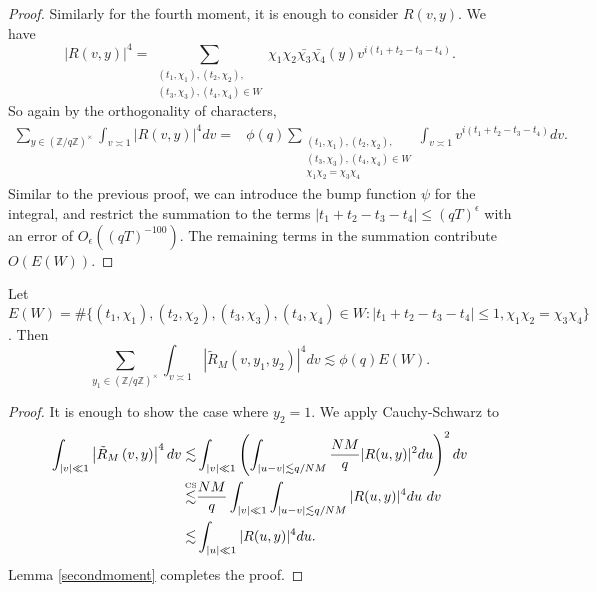 \begin{proof}
	Similarly for the fourth moment, it is enough to consider $R(v,y)$. We have \[
	|R(v,y)|^4 = \sum_{\substack{(t_1,\chi_1),(t_2,\chi_2),\\ (t_3,\chi_3),(t_4,\chi_4)\in  W}}
	\chi_1{\chi}_2\bar{\chi_3}\bar{\chi_4}(y)v^{i(t_1+t_2-t_3-t_4)}.
	\]
	So again by the orthogonality of characters, \begin{align*}
		\sum_{y\in (\mathbb{Z}/q\mathbb{Z})^\times} \int_{v\asymp 1} 
		\left|R\left(v,y\right)\right|^4dv = & \phi(q)
		\sum_{\substack{(t_1,\chi_1),(t_2,\chi_2),\\ (t_3,\chi_3),(t_4,\chi_4)\in  W\\ \chi_1\chi_2=\chi_3\chi_4}} \int_{v\asymp 1} v^{i(t_1+t_2-t_3-t_4)} dv.
	\end{align*}
	Similar to the previous proof, we can introduce the bump function $\psi$ for the integral, and restrict the summation to the terms $|t_1+t_2-t_3-t_4|\leq (qT)^\epsilon$ with an error of $O_\epsilon((qT)^{-100})$. The remaining terms in the summation contribute $O(E( W))$.
\end{proof}
\begin{lemma}\label{fourthmoment_smooth}
	Let $E( W)=\#\{(t_1,\chi_1),(t_2,\chi_2),(t_3,\chi_3),(t_4,\chi_4)\in  W  :  |t_1+t_2-t_3-t_4|\leq 1, \chi_1\chi_2=\chi_3\chi_4\}$. Then \[
	\sum_{y_1\in (\mathbb{Z}/q\mathbb{Z})^\times} \int_{v\asymp 1} 
	\left|\tilde{R}_M\left(v,y_1,y_2\right)\right|^4dv  \lesssim \phi(q)E( W).
	\]
\end{lemma}
\begin{proof}
	It is enough to show the case where $y_2=1$.
	We apply Cauchy-Schwarz to \begin{align*}
		\int_{|v|\ll 1} 
		\left|\tilde{R}_M\left(v,y\right)\right|^4dv  \lesssim& \int_{|v|\ll 1} 
		\left(\int_{|u-v|\lesssim q/NM}
		\frac{NM}{q}|R(u,y)|^2 du\right)^2
		dv \\
		\stackon{CS}{\lesssim}& \frac{NM}{q} \int_{|v|\ll 1} 
		\int_{|u-v|\lesssim q/NM}
		|R(u,y)|^4 du \ 
		dv\\
		\lesssim&  
		\int_{|u|\ll 1}
		|R(u,y)|^4 du.
	\end{align*}
	Lemma \ref{secondmoment} completes the proof.
\end{proof}

